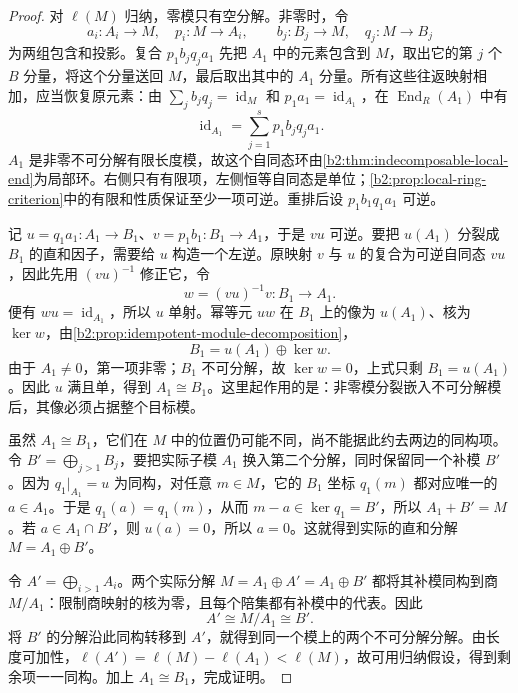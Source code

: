 \begin{proof}
	对 \(\ell(M)\) 归纳，零模只有空分解。非零时，令
	\[
		a_i:A_i\rightarrow M,\quad p_i:M\rightarrow A_i,\qquad b_j:B_j\rightarrow M,\quad q_j:M\rightarrow B_j
	\]
	为两组包含和投影。复合 \(p_1b_jq_ja_1\) 先把 \(A_1\) 中的元素包含到 \(M\)，取出它的第 \(j\) 个 \(B\) 分量，将这个分量送回 \(M\)，最后取出其中的 \(A_1\) 分量。所有这些往返映射相加，应当恢复原元素：由 \(\sum_jb_jq_j=\operatorname{id}_M\) 和 \(p_1a_1=\operatorname{id}_{A_1}\)，在 \(\operatorname{End}_R(A_1)\) 中有
	\begin{equation}\label{b2:eq:krull-schmidt-unit-sum}
		\operatorname{id}_{A_1}=\sum_{j=1}^s p_1b_jq_ja_1.
	\end{equation}
	\(A_1\) 是非零不可分解有限长度模，故这个自同态环由\cref{b2:thm:indecomposable-local-end}为局部环。右侧只有有限项，左侧恒等自同态是单位；\cref{b2:prop:local-ring-criterion}中的有限和性质保证至少一项可逆。重排后设 \(p_1b_1q_1a_1\) 可逆。

	记 \(u=q_1a_1:A_1\rightarrow B_1\)、\(v=p_1b_1:B_1\rightarrow A_1\)，于是 \(vu\) 可逆。要把 \(u(A_1)\) 分裂成 \(B_1\) 的直和因子，需要给 \(u\) 构造一个左逆。原映射 \(v\) 与 \(u\) 的复合为可逆自同态 \(vu\)，因此先用 \((vu)^{-1}\) 修正它，令
	\[
		w=(vu)^{-1}v:B_1\longrightarrow A_1.
	\]
	便有 \(wu=\operatorname{id}_{A_1}\)，所以 \(u\) 单射。幂等元 \(uw\) 在 \(B_1\) 上的像为 \(u(A_1)\)、核为 \(\ker w\)，由\cref{b2:prop:idempotent-module-decomposition}，
	\[
		B_1=u(A_1)\oplus\ker w.
	\]
	由于 \(A_1\ne0\)，第一项非零；\(B_1\) 不可分解，故 \(\ker w=0\)，上式只剩 \(B_1=u(A_1)\)。因此 \(u\) 满且单，得到 \(A_1\cong B_1\)。这里起作用的是：非零模分裂嵌入不可分解模后，其像必须占据整个目标模。

	虽然 \(A_1\cong B_1\)，它们在 \(M\) 中的位置仍可能不同，尚不能据此约去两边的同构项。令 \(B'=\bigoplus_{j>1}B_j\)，要把实际子模 \(A_1\) 换入第二个分解，同时保留同一个补模 \(B'\)。因为 \(q_1|_{A_1}=u\) 为同构，对任意 \(m\in M\)，它的 \(B_1\) 坐标 \(q_1(m)\) 都对应唯一的 \(a\in A_1\)。于是 \(q_1(a)=q_1(m)\)，从而 \(m-a\in\ker q_1=B'\)，所以 \(A_1+B'=M\)。若 \(a\in A_1\cap B'\)，则 \(u(a)=0\)，所以 \(a=0\)。这就得到实际的直和分解 \(M=A_1\oplus B'\)。

	令 \(A'=\bigoplus_{i>1}A_i\)。两个实际分解 \(M=A_1\oplus A'=A_1\oplus B'\) 都将其补模同构到商 \(M/A_1\)：限制商映射的核为零，且每个陪集都有补模中的代表。因此
	\[
		A'\cong M/A_1\cong B'.
	\]
	将 \(B'\) 的分解沿此同构转移到 \(A'\)，就得到同一个模上的两个不可分解分解。由长度可加性，\(\ell(A')=\ell(M)-\ell(A_1)<\ell(M)\)，故可用归纳假设，得到剩余项一一同构。加上 \(A_1\cong B_1\)，完成证明。
\end{proof}

